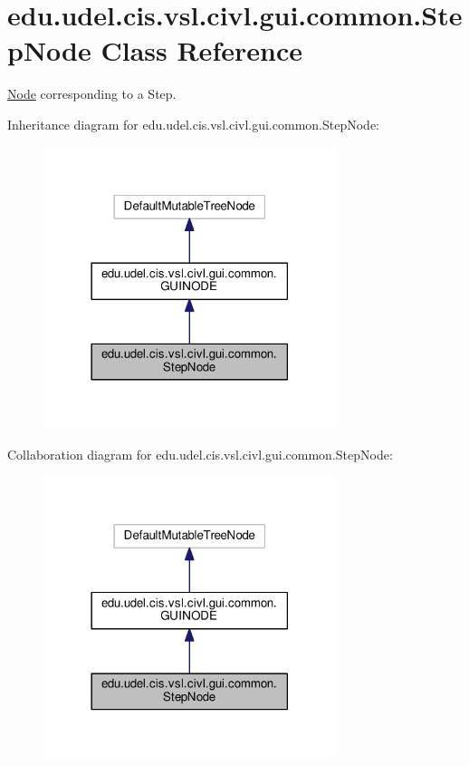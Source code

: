 \hypertarget{classedu_1_1udel_1_1cis_1_1vsl_1_1civl_1_1gui_1_1common_1_1StepNode}{}\section{edu.\+udel.\+cis.\+vsl.\+civl.\+gui.\+common.\+Step\+Node Class Reference}
\label{classedu_1_1udel_1_1cis_1_1vsl_1_1civl_1_1gui_1_1common_1_1StepNode}


\hyperlink{structNode}{Node} corresponding to a Step.  




Inheritance diagram for edu.\+udel.\+cis.\+vsl.\+civl.\+gui.\+common.\+Step\+Node\+:
\nopagebreak
\begin{figure}[H]
\begin{center}
\leavevmode
\includegraphics[width=242pt]{classedu_1_1udel_1_1cis_1_1vsl_1_1civl_1_1gui_1_1common_1_1StepNode__inherit__graph}
\end{center}
\end{figure}


Collaboration diagram for edu.\+udel.\+cis.\+vsl.\+civl.\+gui.\+common.\+Step\+Node\+:
\nopagebreak
\begin{figure}[H]
\begin{center}
\leavevmode
\includegraphics[width=242pt]{classedu_1_1udel_1_1cis_1_1vsl_1_1civl_1_1gui_1_1common_1_1StepNode__coll__graph}
\end{center}
\end{figure}
